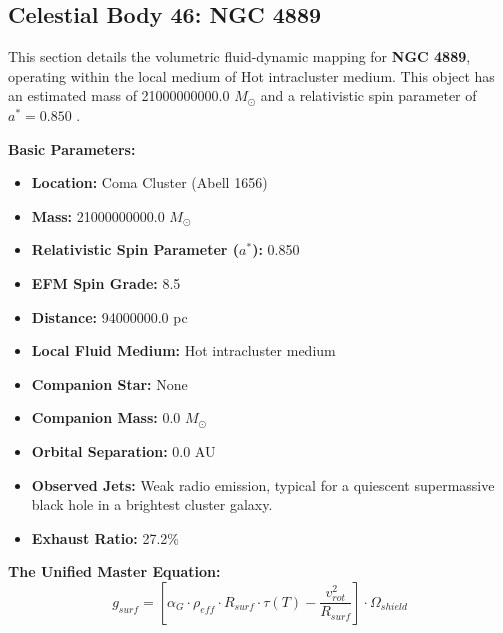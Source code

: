 \documentclass[11pt, a4paper]{article}
\begin{document}
\clearpage
\subsection{Celestial Body 46: NGC 4889}
This section details the volumetric fluid-dynamic mapping for \textbf{NGC 4889}, operating within the local medium of Hot intracluster medium. This object has an estimated mass of 21000000000.0 $M_{\odot}$ and a relativistic spin parameter of $a^* = 0.850$ \cite{mcconnell2011, ned}.

\vspace{0.5em}
\noindent \textbf{Basic Parameters:}
\begin{itemize}
  \item \textbf{Location:} Coma Cluster (Abell 1656)
  \item \textbf{Mass:} 21000000000.0 $M_{\odot}$
  \item \textbf{Relativistic Spin Parameter ($a^*$):} 0.850
  \item \textbf{EFM Spin Grade:} 8.5
  \item \textbf{Distance:} 94000000.0 pc
  \item \textbf{Local Fluid Medium:} Hot intracluster medium
  \item \textbf{Companion Star:} None
  \item \textbf{Companion Mass:} 0.0 $M_{\odot}$
  \item \textbf{Orbital Separation:} 0.0 AU
  \item \textbf{Observed Jets:} Weak radio emission, typical for a quiescent supermassive black hole in a brightest cluster galaxy.
  \item \textbf{Exhaust Ratio:} 27.2\%
\end{itemize}

\vspace{0.5em}
\noindent \textbf{The Unified Master Equation:}
$$ g_{surf} = \left[ \alpha_G \cdot \rho_{eff} \cdot R_{surf} \cdot \tau(T) - \frac{v_{rot}^2}{R_{surf}} \right] \cdot \Omega_{shield} $$
\end{document}
